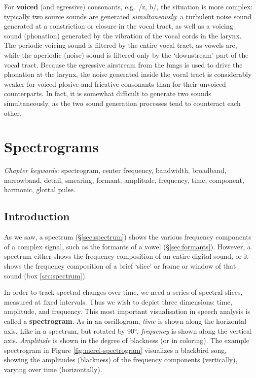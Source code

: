 \documentclass[
]{book}
\begin{document}
For \textbf{voiced} (and egressive) consonants, e.g.~/z, b/, the situation is more complex: typically two source sounds are generated \emph{simultaneously}: a turbulent noise sound generated at a constriction or closure in the vocal tract, as well as a voicing sound (phonation) generated by the vibration of the vocal cords in the larynx. The periodic voicing sound is filtered by the entire vocal tract, as vowels are, while the aperiodic (noise) sound is filtered only by the `downstream' part of the vocal tract.
Because the egressive airstream from the lungs is used to drive the phonation at the larynx, the noise generated inside the vocal tract is considerably weaker for voiced plosive and fricative consonants than for their unvoiced counterparts. In fact, it is somewhat difficult to generate two sounds simultaneously, as the two sound generation processes tend to counteract each other.

\chapter{Spectrograms}\label{ch-spectrograms}

\emph{Chapter keywords}: spectrogram, center frequency, bandwidth, broadband, narrowband, detail, smearing, formant, amplitude, frequency, time, component, harmonic, glottal pulse.

\section{Introduction}\label{sec:spectrogram-intro}

As we saw, a spectrum (§\ref{sec:spectrum}) shows the various frequency components of a complex signal, such as the formants of a vowel (§\ref{sec:formants}). However, a spectrum either shows the frequency composition of an entire digital sound, or it shows the frequency composition of a brief `slice' or frame or window of that sound (box \ref{sec:spectrum}).

In order to track spectral changes over time, we need a series of spectral slices, measured at fixed intervals. Thus we wish to depict three dimensions: time, amplitude, and frequency. This most important visualisation in speech analysis is called a \textbf{spectrogram}. As in an oscillogram, \emph{time} is shown along the horizontal axis. Like in a spectrum, but rotated by 90°, \emph{frequency} is shown along the vertical axis. \emph{Amplitude} is shown in the degree of blackness (or in coloring).
The example spectrogram in Figure \ref{fig:merel-spectrogram} visualizes a blackbird song, showing the amplitudes (blackness) of the frequency components (vertically), varying over time (horizontally).
\end{document}
